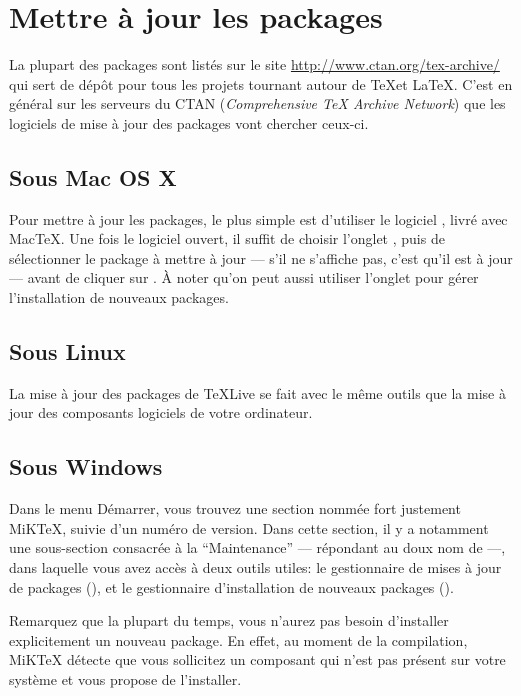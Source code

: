 \section{Mettre à jour les packages}\label{maj}

La plupart des packages sont listés sur le site \url{http://www.ctan.org/tex-archive/} qui sert de dépôt pour tous les projets tournant autour de \TeX et \LaTeX. C'est  en général sur les serveurs du CTAN (\textenglish{\emph{Comprehensive TeX Archive Network}}) que les logiciels de mise à jour des packages vont chercher  ceux-ci.

\subsection{Sous Mac OS X}\label{majosX}

Pour mettre à jour les packages, le plus simple est d'utiliser le logiciel , livré avec MacTeX. Une fois le logiciel ouvert, il suffit  de choisir l'onglet , puis de sélectionner le package à mettre à jour --- s'il ne s'affiche pas, c'est qu'il est à jour --- avant de cliquer sur . À noter qu'on peut aussi utiliser l'onglet  pour gérer l'installation de nouveaux packages.

\subsection{Sous Linux}

La mise à jour des packages de TeXLive se fait avec le même outils que la mise à jour des composants logiciels de votre ordinateur.

\subsection{Sous Windows}

Dans le menu Démarrer, vous trouvez une section nommée fort justement MiKTeX, suivie d'un numéro de version. Dans cette section, il y a notamment une sous-section consacrée à la \enquote{Maintenance} –-- répondant au doux nom de  --–, dans laquelle vous avez accès à deux outils utiles: le gestionnaire de mises à jour de packages (), et le gestionnaire d'installation de nouveaux packages ().

Remarquez que la plupart du temps, vous n'aurez pas besoin d'installer explicitement un nouveau package. En effet, au moment de la compilation, MiKTeX détecte que vous sollicitez un composant qui n'est pas présent sur votre système et vous propose de l'installer.
